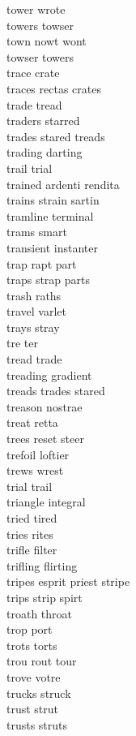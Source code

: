 tower wrote\\
towers towser\\
town nowt wont\\
towser towers\\
trace crate\\
traces rectas crates\\
trade tread\\
traders starred\\
trades stared treads\\
trading darting\\
trail trial\\
trained ardenti rendita\\
trains strain sartin\\
tramline terminal\\
trams smart\\
transient instanter\\
trap rapt part\\
traps strap parts\\
trash raths\\
travel varlet\\
trays stray\\
tre ter\\
tread trade\\
treading gradient\\
treads trades stared\\
treason nostrae\\
treat retta\\
trees reset steer\\
trefoil loftier\\
trews wrest\\
trial trail\\
triangle integral\\
tried tired\\
tries rites\\
trifle filter\\
trifling flirting\\
tripes esprit priest stripe\\
trips strip spirt\\
troath throat\\
trop port\\
trots torts\\
trou rout tour\\
trove votre\\
trucks struck\\
trust strut\\
trusts struts\\
